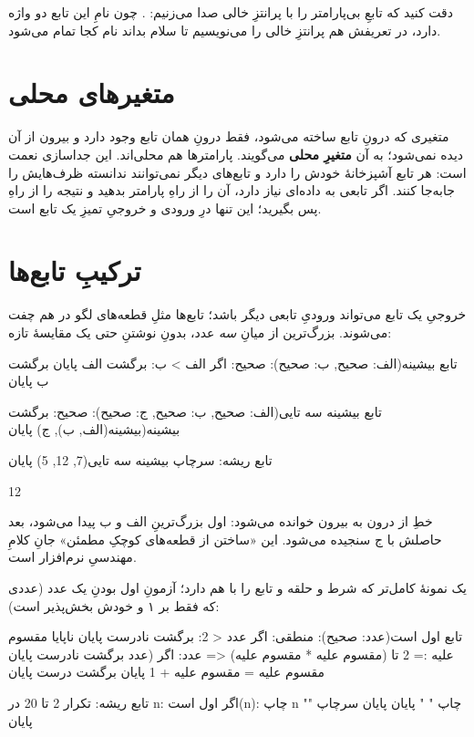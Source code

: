 دقت کنید که تابعِ بی‌پارامتر را با پرانتزِ خالی صدا می‌زنیم:
. چون نامِ این تابع دو واژه دارد، در تعریفش هم پرانتزِ خالی
را می‌نویسیم تا سلام بداند نام کجا تمام می‌شود.

\section{متغیرهای محلی}

متغیری که درونِ تابع ساخته می‌شود، فقط درونِ همان تابع وجود دارد و بیرون
از آن دیده نمی‌شود؛ به آن \textbf{متغیرِ محلی} می‌گویند. پارامترها هم
محلی‌اند. این جداسازی نعمت است: هر تابع آشپزخانهٔ خودش را دارد و تابع‌های
دیگر نمی‌توانند ندانسته ظرف‌هایش را جابه‌جا کنند. اگر تابعی به داده‌ای
نیاز دارد، آن را از راهِ پارامتر بدهید و نتیجه را از راهِ 
پس بگیرید؛ این تنها درِ ورودی و خروجیِ تمیزِ یک تابع است.

\section{ترکیبِ تابع‌ها}

خروجیِ یک تابع می‌تواند ورودیِ تابعی دیگر باشد؛ تابع‌ها مثلِ قطعه‌های لگو در
هم چفت می‌شوند. بزرگ‌ترین از میانِ \emph{سه} عدد، بدونِ نوشتنِ حتی یک
مقایسهٔ تازه:

\begin{salamfa}
تابع بیشینه(الف: صحیح, ب: صحیح): صحیح:
    اگر الف > ب:
        برگشت الف
    پایان
    برگشت ب
پایان

تابع بیشینه سه تایی(الف: صحیح, ب: صحیح, ج: صحیح): صحیح:
    برگشت بیشینه(بیشینه(الف, ب), ج)
پایان

تابع ریشه:
    سرچاپ بیشینه سه تایی(7, 12, 5)
پایان
\end{salamfa}

\begin{progout}
12
\end{progout}

خطِ  از درون به بیرون خوانده می‌شود: اول
بزرگ‌ترینِ الف و ب پیدا می‌شود، بعد حاصلش با ج سنجیده می‌شود. این «ساختن از
قطعه‌های کوچکِ مطمئن» جانِ کلامِ مهندسیِ نرم‌افزار است.

یک نمونهٔ کامل‌تر که شرط و حلقه و تابع را با هم دارد؛ آزمونِ اول بودنِ یک
عدد (عددی که فقط بر ۱ و خودش بخش‌پذیر است):

\begin{salamfa}
تابع اول است(عدد: صحیح): منطقی:
    اگر عدد < 2:
        برگشت نادرست
    پایان
    ناپایا مقسوم علیه := 2
    تا (مقسوم علیه * مقسوم علیه) <= عدد:
        اگر (عدد %
            برگشت نادرست
        پایان
        مقسوم علیه = مقسوم علیه + 1
    پایان
    برگشت درست
پایان

تابع ریشه:
    تکرار 2 تا 20 در n:
        اگر اول است(n):
            چاپ n
            چاپ " "
        پایان
    پایان
    سرچاپ ""
پایان
\end{salamfa}

